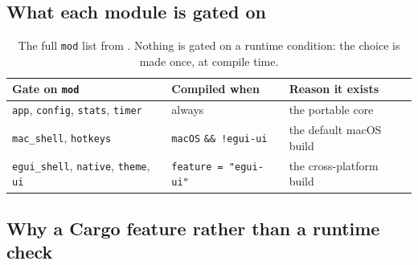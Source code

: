 \subsection{What each module is gated on}

\begin{table}[H]
\centering\small
\begin{tabular}{@{}p{34mm} p{40mm} p{66mm}@{}}
\toprule
\textbf{Gate on \texttt{mod}} & \textbf{Compiled when} & \textbf{Reason it exists} \\
\midrule
\texttt{app}, \texttt{config}, \texttt{stats}, \texttt{timer} & always & the portable core \\
\texttt{mac\_shell}, \texttt{hotkeys} & \texttt{macOS} \texttt{\&\& !egui-ui} & the default macOS build \\
\texttt{egui\_shell}, \texttt{native}, \texttt{theme}, \texttt{ui} & \texttt{feature = "egui-ui"} & the cross-platform build \\
\bottomrule
\end{tabular}
\caption{The full \texttt{mod} list from . Nothing is gated on a runtime
condition: the choice is made once, at compile time.}
\end{table}

\subsection{Why a Cargo feature rather than a runtime check}

